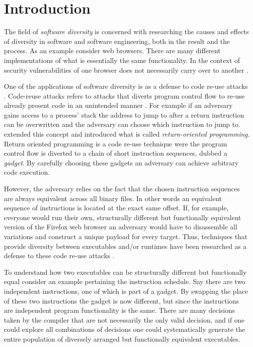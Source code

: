 \chapter{Introduction}

The field of \textit{software diversity} is concerned with researching the
causes and effects of diversity in software and software engineering, both in the result
and the process. As an example consider web browsers. There are many different implementations
of what is essentially the same functionality. In the context of security vulnerabilities
of one browser does not necessarily carry over to another \cite{survey}.

One of the applications of software diversity is as a defense to code re-use attacks \cite{survey}.
Code-reuse attacks refers to attacks that diverts program control flow to re-use already
present code in an unintended manner \cite{code-re-use}. For example if an adversary gains
access to a process' stack the address to jump to after a return instruction can be
overwritten and the adversary can choose which instruction to jump to. \textcite{rop}
extended this concept and introduced what is called \textit{return-oriented programming}.
Return oriented programming is a code re-use technique were the program control flow is
diverted to a chain of short instruction sequences, dubbed a \textit{gadget}. By carefully
choosing these gadgets an adversary can achieve arbitrary code execution.

However, the adversary relies on the fact that the chosen instruction sequences are always
equivalent across all binary files. In other words an equivalent sequence of instructions
is located at the exact same offset. If, for example, everyone would run their own,
structurally different but functionally equivalent version of the Firefox web browser an
adversary would have to disassemble all variations and construct a unique payload for
every target. Thus, techniques that provide diversity between executables and/or runtimes
have been researched as a defense to these code re-use attacks \cite{survey}.

To understand how two executables can be structurally different but functionally equal
consider an example pertaining the instruction schedule. Say there are two independent
instructions, one of which is part of a gadget. By swapping the place of these two
instructions the gadget is now different, but since the instructions are independent
program functionality is the same. There are many decisions taken by the compiler that are
not necessarily the only valid decision, and if one could explore all combinations of
decisions one could systematically generate the entire population of diversely arranged
but functionally equivalent executables.


